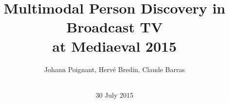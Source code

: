 \documentclass{acm_proc_article-me}
\begin{document}
%

\title{
Multimodal Person Discovery in Broadcast TV \\
at Mediaeval 2015
}
%
%
%
%
%


\author{
%
%
\alignauthor
Johann Poignant, Herv\'e Bredin, Claude Barras \\
\\
}
\date{30 July 2015}
\end{document}
